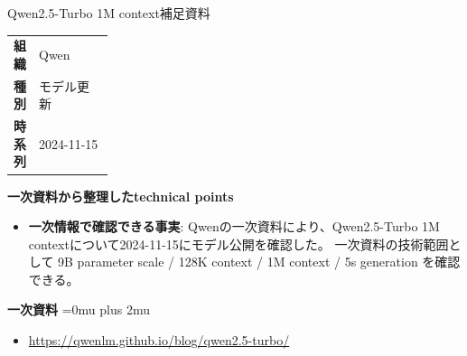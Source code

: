 \begin{technicalnote}{Qwen2.5-Turbo 1M context}{補足資料}
\begingroup
\begin{tabularx}{\linewidth}{@{}>{\bfseries}p{0.22\linewidth}X@{}}
組織 & Qwen \\
種別 & モデル更新 \\
時系列 & 2024-11-15 \\
\end{tabularx}
\smallskip
{\bfseries 一次資料から整理したtechnical points}
\begin{itemize}[leftmargin=1.5em,itemsep=0.35em]
\item \textbf{一次情報で確認できる事実}: Qwenの一次資料により、Qwen2.5-Turbo 1M contextについて2024-11-15にモデル公開を確認した。 一次資料の技術範囲として 9B parameter scale / 128K context / 1M context / 5s generation を確認できる。
\end{itemize}
\begin{minipage}{\linewidth}
\begin{samepage}
{\bfseries 一次資料}
\begingroup\sloppy
\Urlmuskip=0mu plus 2mu\relax
\begin{itemize}[leftmargin=1.5em,itemsep=0.25em]
\item {\scriptsize\url{https://qwenlm.github.io/blog/qwen2.5-turbo/}}
\end{itemize}
\endgroup
\end{samepage}
\end{minipage}
\endgroup
\end{technicalnote}
\medskip

